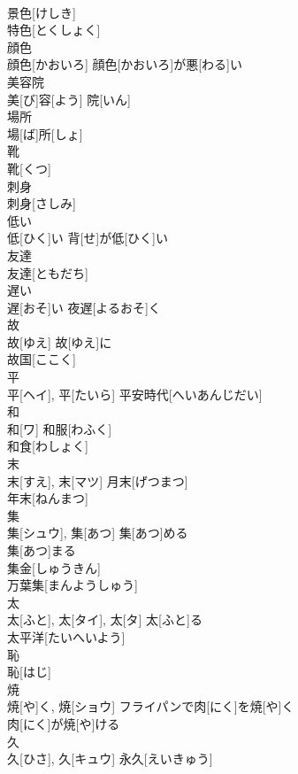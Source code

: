 \documentclass[8pt]{extreport}
\begin{document}
\begin{CJK}{UTF8}{min}
\\	景色[けしき] 
\\	特色[とくしょく] 
\\	顔色	
\\	顔色[かおいろ]	顔色[かおいろ]が悪[わる]い 
\\	美容院	
\\	美[び]容[よう] 院[いん]	
\\	場所	
\\	場[ば]所[しょ]	
\\	靴	
\\	靴[くつ]	
\\	刺身	
\\	刺身[さしみ]	
\\	低い	
\\	低[ひく]い	背[せ]が低[ひく]い 
\\	友達	
\\	友達[ともだち]	
\\	遅い	
\\	遅[おそ]い	夜遅[よるおそ]く 
\\	故	
\\	故[ゆえ]	故[ゆえ]に 
\\	故国[ここく] 
\\	平	
\\	平[ヘイ], 平[たいら]	平安時代[へいあんじだい] 
\\	和	
\\	和[ワ]	和服[わふく] 
\\	和食[わしょく] 
\\	末	
\\	末[すえ], 末[マツ]	月末[げつまつ]
\\	年末[ねんまつ] 
\\	集	
\\	集[シュウ], 集[あつ]	集[あつ]める 
\\	集[あつ]まる 
\\	集金[しゅうきん] 
\\	万葉集[まんようしゅう] 
\\	太	
\\	太[ふと], 太[タイ], 太[タ]	太[ふと]る 
\\	太平洋[たいへいよう] 
\\	恥	
\\	恥[はじ]	
\\	焼	
\\	焼[や]く, 焼[ショウ]	フライパンで肉[にく]を焼[や]く 
\\	肉[にく]が焼[や]ける 
\\	久	
\\	久[ひさ], 久[キュウ]	永久[えいきゅう] 

\end{CJK}
\end{document}
